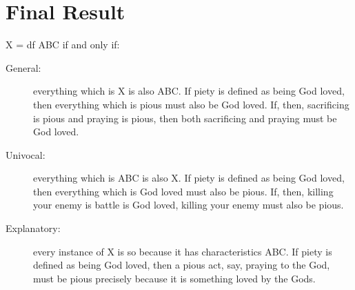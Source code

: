 \documentclass[oneside]{article}
\begin{document}





\section*{Final Result}
 X = df ABC if and only if: 
\begin{description}
\item[General:] everything which is X is also ABC. If piety is defined as being God loved, then everything which is pious must also be God loved. If, then, sacrificing is pious and praying is pious, then both sacrificing and praying must be God loved. 
\item[Univocal:] everything which is ABC is also X. If piety is defined as being God loved, then everything which is God loved must also be pious. If, then, killing your enemy is battle is God loved, killing your enemy must also be pious. 
\item[Explanatory:]  every instance of X is so because it has characteristics ABC. If piety is defined as being God loved, then a pious act, say, praying to the God, must be pious precisely because it is something loved by the Gods. 
\end{description}
\end{document}
